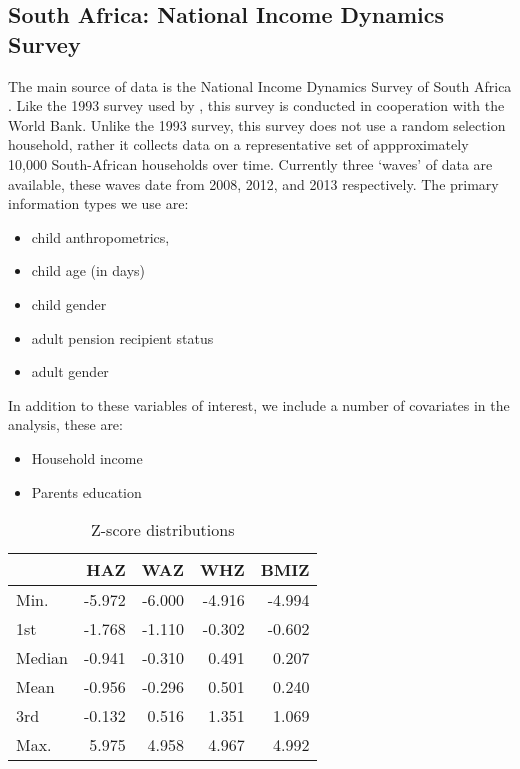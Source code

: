 \begin{refsection}
\subsection{South Africa: National Income Dynamics Survey}
The main source of data is the National Income Dynamics Survey of South Africa \parencite{saldru2008nids, saldru2012nids, saldru2013nids}.
Like the 1993 survey used by \textcite{duflo2000child, duflo2003grandmothers}, this survey is conducted in cooperation with the World Bank.
Unlike the 1993 survey, this survey does not use a random selection household,
rather it collects data on a representative set of appproximately 10,000 South-African households over time.
Currently three `waves' of data are available, these waves date from 2008, 2012, and 2013 respectively.
The primary information types we use are:
\begin{itemize}
  \item child anthropometrics,
  \item child age (in days)
  \item child gender
  \item adult pension recipient status
  \item adult gender
\end{itemize}
In addition to these variables of interest, we include a number of covariates in the analysis, these are:
\begin{itemize}
  \item Household income
  \item Parents education
\end{itemize}

\begin{table}[hb!]
\centering
\caption{Z-score distributions}
\label{sa:ta:zscore}
    \begin{tabular}{l|rrrr}
    \hline
    & HAZ & WAZ & WHZ & BMIZ\\
    \hline
    Min.   & -5.972 & -6.000  & -4.916 & -4.994 \\
    1st    & -1.768 & -1.110  & -0.302 & -0.602 \\
    Median & -0.941 & -0.310  &  0.491  & 0.207  \\
    Mean   & -0.956 & -0.296  &  0.501  & 0.240   \\
    3rd    & -0.132 &  0.516  &  1.351  & 1.069  \\
    Max.   &  5.975 &  4.958  &  4.967  & 4.992  \\
    \end{tabular}
\end{table}


\end{refsection}
